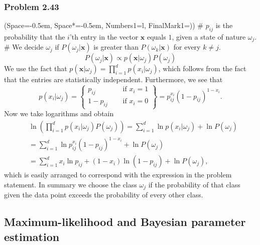 \documentclass[12pt, a4paper]{article}
\newcommand{\listSpace}{-0.5em}%
\newcommand{\vect}[1]{\bm{#1}}
\begin{document}
\subsubsection*{Problem 2.43}
\begin{easylist}[enumerate]
	\ListProperties(Space=\listSpace, Space*=\listSpace, Numbers1=l, FinalMark1={)})
	# $p_{ij}$ is the probability that the $i$'th entry in the vector $\vect{x}$ equals $1$, given a state of nature $\omega_j$.
	# We decide $\omega_j$ if $P(\omega_j | \vect{x})$ is greater than $P(\omega_k | \vect{x})$ for every $k \neq j$.
	\begin{equation*}
	P(\omega_j | \vect{x}) \propto p(  \vect{x} | \omega_j) P(\omega_j)
	\end{equation*}
	We use the fact that $p(  \vect{x} | \omega_j) = \prod_{i = 1}^{d} p(  x_i| \omega_j)$, which follows from the fact that the entries are statistically independent.
	Furthermore, we see that
	\begin{equation*}
	p(  x_i| \omega_j) = 
	\left\{\!\begin{aligned}
	p_{ij} &\quad \text{ if } x_i = 1 \\
	1 - p_{ij} &\quad \text{ if } x_i = 0 
	\end{aligned}\right\} = 
	p_{ij}^{x_i} \left( 1 - p_{ij}\right)^{ 1 - x_i}.
	\end{equation*}
	Now we take logarithms and  obtain
	\begin{align*}
	& \ln \left( \prod_{i = 1}^{d} p(  x_i| \omega_j) P(\omega_j) \right) =
	\sum_{i = 1}^{d} \ln p(  x_i| \omega_j)  + \ln P(\omega_j) \\
	& = \sum_{i = 1}^{d} \ln p_{ij}^{x_i} \left( 1 - p_{ij}\right)^{ 1 - x_i}  + \ln P(\omega_j) \\
	&
	= \sum_{i = 1}^{d} x_i \ln p_{ij} + (1 - x_i) \ln ( 1 - p_{ij})  + \ln P(\omega_j),
	\end{align*}
	which is easily arranged to correspond with the expression in the problem statement. 
	In summary we choose the class $\omega_j$ if the probability of that class given the data point exceeds the probability of every other class.
\end{easylist}



\clearpage
\subsection{Maximum-likelihood and Bayesian parameter estimation}
\end{document}
